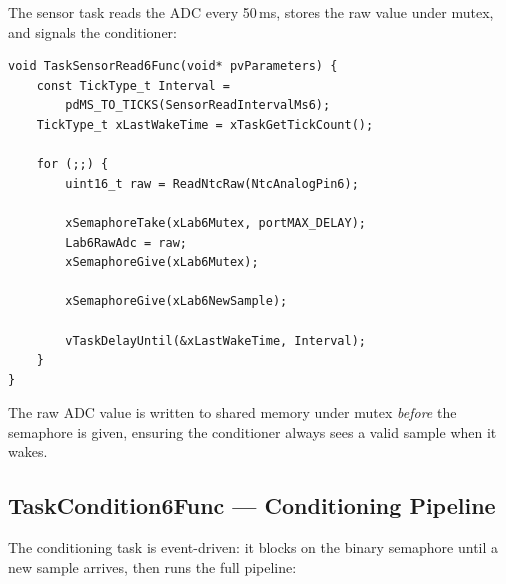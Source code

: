 \documentclass[12pt]{article}
\begin{document}
The sensor task reads the ADC every 50\,ms, stores the raw value under mutex, and signals the conditioner:

\begin{lstlisting}[caption={TaskSensorRead6Func --- periodic sensor acquisition}]
void TaskSensorRead6Func(void* pvParameters) {
    const TickType_t Interval =
        pdMS_TO_TICKS(SensorReadIntervalMs6);
    TickType_t xLastWakeTime = xTaskGetTickCount();

    for (;;) {
        uint16_t raw = ReadNtcRaw(NtcAnalogPin6);

        xSemaphoreTake(xLab6Mutex, portMAX_DELAY);
        Lab6RawAdc = raw;
        xSemaphoreGive(xLab6Mutex);

        xSemaphoreGive(xLab6NewSample);

        vTaskDelayUntil(&xLastWakeTime, Interval);
    }
}
\end{lstlisting}

The raw ADC value is written to shared memory under mutex \emph{before} the semaphore is given, ensuring the conditioner always sees a valid sample when it wakes.

\subsection{TaskCondition6Func --- Conditioning Pipeline}

The conditioning task is event-driven: it blocks on the binary semaphore until a new sample arrives, then runs the full pipeline:
\end{document}
